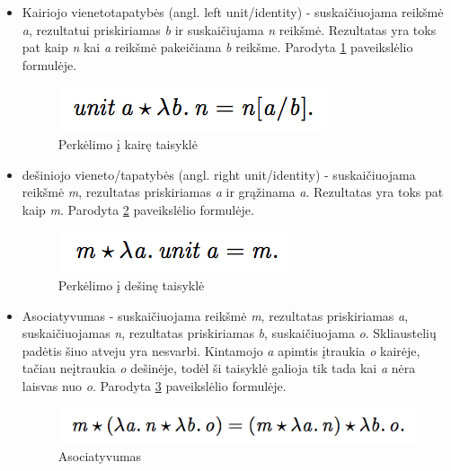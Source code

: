 \begin{itemize}

	\item Kairiojo vienetotapatybės (angl. left unit/identity) - suskaičiuojama reikšmė \textit{a}, rezultatui priskiriamas \textit{b} ir suskaičiujama \textit{n} reikšmė. Rezultatas yra toks pat kaip \textit{n} kai \textit{a} reikšmė pakeičiama \textit{b} reikšme. Parodyta \ref{pic:left} paveikslėlio formulėje.

\begin{figure}[ht]
	\centering
	\includegraphics{pics/left.png}
	\caption{Perkėlimo į kairę taisyklė}
	\label{pic:left}
\end{figure}

	\item dešiniojo vieneto/tapatybės (angl. right unit/identity) - suskaičiuojama reikšmė \textit{m}, rezultatas priskiriamas \textit{a} ir grąžinama \textit{a}. Rezultatas yra toks pat kaip \textit{m}. Parodyta \ref{pic:right} paveikslėlio formulėje.

\begin{figure}[ht]
	\centering
	\includegraphics{pics/right.png}
	\caption{Perkėlimo į dešinę taisyklė}
	\label{pic:right}
\end{figure}

	\item Asociatyvumas - suskaičiuojama reikšmė \textit{m}, rezultatas priskiriamas \textit{a}, suskaičiuojamas \textit{n}, rezultatas priskiriamas \textit{b}, suskaičiuojama \textit{o}. Skliaustelių padėtis šiuo atveju yra nesvarbi. Kintamojo \textit{a} apimtis įtraukia \textit{o} kairėje, tačiau neįtraukia \textit{o} dešinėje, todėl ši taisyklė galioja tik tada kai \textit{a} nėra laisvas nuo \textit{o}. Parodyta \ref{pic:associative} paveikslėlio formulėje.

\begin{figure}[ht]
	\centering
	\includegraphics{pics/associative.png}
	\caption{Asociatyvumas}
	\label{pic:associative}
\end{figure}

\end{itemize}


